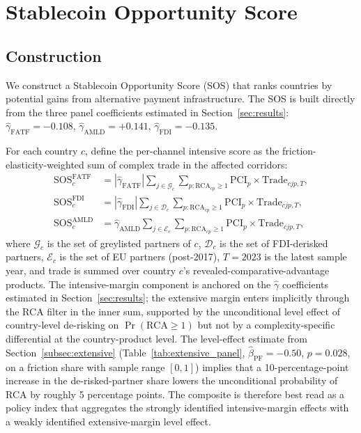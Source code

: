 \section{Stablecoin Opportunity Score}
\label{sec:sos}

\subsection{Construction}

We construct a Stablecoin Opportunity Score (SOS) that ranks countries by potential gains from alternative payment infrastructure. The SOS is built directly from the three panel coefficients estimated in Section~\ref{sec:results}: $\hat{\gamma}_{\text{FATF}} = -0.108$, $\hat{\gamma}_{\text{AMLD}} = +0.141$, $\hat{\gamma}_{\text{FDI}} = -0.135$.

For each country $c$, define the per-channel intensive score as the friction-elasticity-weighted sum of complex trade in the affected corridors:
\begin{align}
\text{SOS}^{\text{FATF}}_c &= |\hat{\gamma}_{\text{FATF}}| \sum_{j \in \mathcal{G}_c} \sum_{p: \text{RCA}_{cp} \geq 1} \text{PCI}_p \times \text{Trade}_{cjp,T}, \\
\text{SOS}^{\text{FDI}}_c  &= |\hat{\gamma}_{\text{FDI}}|  \sum_{j \in \mathcal{D}_c} \sum_{p: \text{RCA}_{cp} \geq 1} \text{PCI}_p \times \text{Trade}_{cjp,T}, \\
\text{SOS}^{\text{AMLD}}_c &= \hat{\gamma}_{\text{AMLD}}    \sum_{j \in \mathcal{E}_c} \sum_{p: \text{RCA}_{cp} \geq 1} \text{PCI}_p \times \text{Trade}_{cjp,T},
\end{align}
where $\mathcal{G}_c$ is the set of greylisted partners of $c$, $\mathcal{D}_c$ is the set of FDI-derisked partners, $\mathcal{E}_c$ is the set of EU partners (post-2017), $T = 2023$ is the latest sample year, and trade is summed over country $c$'s revealed-comparative-advantage products. The intensive-margin component is anchored on the $\hat{\gamma}$ coefficients estimated in Section~\ref{sec:results}; the extensive margin enters implicitly through the RCA filter in the inner sum, supported by the unconditional level effect of country-level de-risking on $\Pr(\text{RCA}\geq 1)$ but not by a complexity-specific differential at the country-product level. The level-effect estimate from Section~\ref{subsec:extensive} (Table~\ref{tab:extensive_panel}, $\hat{\beta}_{\text{PF}} = -0.50$, $p = 0.028$, on a friction share with sample range $[0,1]$) implies that a 10-percentage-point increase in the de-risked-partner share lowers the unconditional probability of RCA by roughly 5 percentage points. The composite is therefore best read as a policy index that aggregates the strongly identified intensive-margin effects with a weakly identified extensive-margin level effect.

